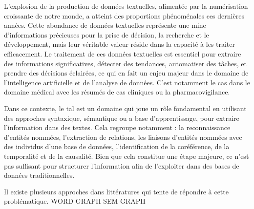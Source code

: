 L'explosion de la production de données textuelles, alimentée par la numérisation croissante de notre monde, a atteint des proportions phénoménales ces dernières années.
Cette abondance de données textuelles représente une mine d'informations précieuses pour la prise de décision, la recherche et le développement, mais leur véritable valeur réside dans la capacité à les traiter efficacement.
Le traitement de ces données textuelles est essentiel pour extraire des informations significatives, détecter des tendances, automatiser des tâches, et prendre des décisions éclairées, ce qui en fait un enjeu majeur dans le domaine de l'intelligence artificielle et de l'analyse de données.
C'est notamment le cas dans le domaine médical avec les résumés de cas cliniques ou la pharmacovigilance.

Dans ce contexte, le \gls{tal} est un domaine qui joue un rôle fondamental en utilisant des approches syntaxique, sémantique ou a base d'apprentissage, pour extraire l'information dans des textes.
Cela regroupe notamment : la reconnaissance d'entités nommées, l'extraction de relations, les liaisons d'entités nommées avec des individus d'une base de données, l'identification de la coréférence, de la temporalité et de la causalité.
Bien que cela constitue une étape majeure, ce n'est pas suffisant pour structurer l'information afin de l'exploiter dans des bases de données traditionnelles.

Il existe plusieurs approches dans littératures qui tente de répondre à cette problématique.
WORD GRAPH
SEM GRAPH
